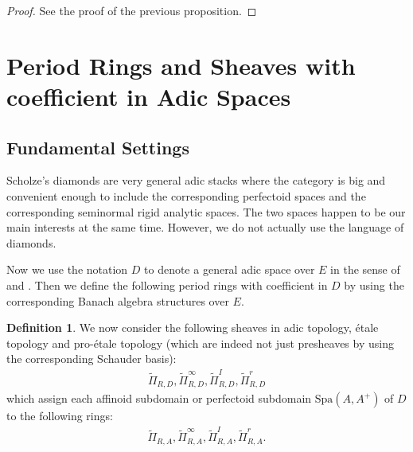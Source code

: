 \documentclass[12pt]{amsart}
\theoremstyle{definition}
\newtheorem{definition}[theorem]{Definition}
\numberwithin{equation}{section}
\begin{document}
\begin{proof}
See the proof of the previous proposition.	
\end{proof}














\newpage


\section{Period Rings and Sheaves with coefficient in Adic Spaces}

\subsection{Fundamental Settings}


\noindent Scholze's diamonds \cite{Sch1} are very general adic stacks where the category is big and convenient enough to include the corresponding perfectoid spaces and the corresponding seminormal rigid analytic spaces. The two spaces happen to be our main interests at the same time. However, we do not actually use the language of diamonds.


\indent Now we use the notation $D$ to denote a general adic space over $E$ in the sense of \cite{KL1} and \cite{KL2}. Then we define the following period rings with coefficient in $D$ by using the corresponding Banach algebra structures over $E$.



\begin{definition}

We now consider the following sheaves in adic topology, \'etale topology and pro-\'etale topology (which are indeed not just presheaves by using the corresponding Schauder basis):
\begin{align}
\widetilde{\Pi}_{R,D},\widetilde{\Pi}^\infty_{R,D},\widetilde{\Pi}^I_{R,D},\widetilde{\Pi}^r_{R,D}	
\end{align}
which assign each affinoid subdomain or perfectoid subdomain $\mathrm{Spa}(A,A^+)$ of $D$ to the following rings:
\begin{align}
\widetilde{\Pi}_{R,A},\widetilde{\Pi}^\infty_{R,A},\widetilde{\Pi}^I_{R,A},\widetilde{\Pi}^r_{R,A}.	
\end{align}

	
\end{definition}
\end{document}
